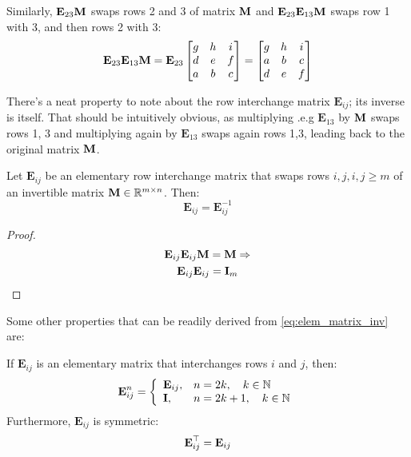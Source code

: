 \documentclass[a4paper]{article}
\begin{document}
Similarly, $\textbf{E}_{23}\textbf{M}$ swaps rows 2 and 3 of matrix $\textbf{M}$ and $\textbf{E}_{23}\textbf{E}_{13}\textbf{M}$ swaps row 1 with 3, and then rows 2 with 3:
\begin{gather*}
\textbf{E}_{23}\textbf{E}_{13}\textbf{M} = 
\textbf{E}_{23}
\begin{bmatrix}
g & h & i\\
d & e & f \\
a & b & c 
\end{bmatrix} = 
\begin{bmatrix}
g & h & i\\
a & b & c \\
d & e & f 
\end{bmatrix}
\end{gather*}

There's a neat property to note about the row interchange matrix $\textbf{E}_{ij}$; its inverse is itself. That should be intuitively obvious, as multiplying .e.g $\textbf{E}_{13}$ by $\textbf{M}$ swaps rows 1, 3 and multiplying again by $\textbf{E}_{13}$ swaps again rows 1,3, leading back to the original matrix $\textbf{M}$.
\begin{lemma}
Let  $\textbf{E}_{ij}$ be an elementary row interchange matrix that swaps rows $i, j, i,j \geq m$ of an invertible matrix $\textbf{M}\in \mathbb{R}^{m\times n}$. Then:
\begin{equation}
    \textbf{E}_{ij} = \textbf{E}_{ij}^{-1}
\end{equation}
\end{lemma}
\begin{proof}
\begin{gather*}
    \textbf{E}_{ij}\textbf{E}_{ij}\textbf{M} = \textbf{M} \Rightarrow \\
    \textbf{E}_{ij}\textbf{E}_{ij} = \textbf{I}_m
    \label{eq:elem_matrix_inv}
\end{gather*}
\end{proof}
Some other properties that can be readily derived from \eqref{eq:elem_matrix_inv} are:
\begin{lemma}
If $\textbf{E}_{ij}$ is an elementary matrix that interchanges rows $i$ and $j$, then:
\begin{equation}
    \textbf{E}_{ij}^n =
    \left\{
    \begin{array}{ll}
    \textbf{E}_{ij}, & n = 2k, \quad k \in \mathbb{N}\\
    \textbf{I} , & n = 2k+1, \quad k \in \mathbb{N}
\end{array} 
\right.
\end{equation}
Furthermore, $\textbf{E}_{ij}$ is symmetric:
\begin{equation}
    \textbf{E}_{ij}^{\top} = \textbf{E}_{ij}
\end{equation}
\end{lemma}
\end{document}
